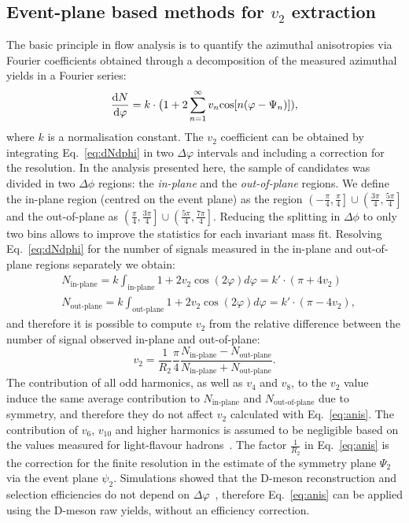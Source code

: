 \subsection{Event-plane based methods for $v_2$ extraction} 
\label{sec:epMethodsDescript}
The basic principle in flow analysis is to quantify the azimuthal 
anisotropies via Fourier coefficients obtained through a 
decomposition of the measured azimuthal yields in a Fourier series:
\begin{equation}
\label{eq:dNdphi}
\frac{{\rm d} N}{{\rm d} \varphi} = k \cdot \big ( 1 + 2 \sum_{n=1}^{\infty} v_n {\rm cos}[n (\varphi - \Psi_n)] ),
\end{equation}
where $k$ is a normalisation constant. 
The $v_2$ coefficient can be obtained by integrating Eq.~\ref{eq:dNdphi}
in two $\Delta \varphi$ intervals and including a correction for the
resolution. In the analysis presented here, the sample of candidates was 
divided in two $\Delta\phi$ regions: the \textit{in-plane} 
and the \textit{out-of-plane} regions. We define the in-plane 
region (centred on the event plane) as the region 
$\left(-\frac{\pi}{4},\frac{\pi}{4}\right]\cup\left(\frac{3\pi}{4},\frac{5\pi}{4}\right]$ and
 the out-of-plane as $\left(\frac{\pi}{4},\frac{3\pi}{4}\right]\cup\left(\frac{5\pi}{4},\frac{7\pi}{4}\right]$. 
 Reducing the splitting in $\Delta\phi$ to only two bins allows 
 to improve the statistics for each invariant mass fit. Resolving 
 Eq.~\ref{eq:dNdphi} for the number of signals measured 
 in the in-plane and out-of-plane regions separately we obtain:
\begin{equation}\label{eq:ninout}
 \begin{split}
  & N_\text{in-plane} = k\int_\text{in-plane}1+2v_2\cos(2\varphi)d\varphi = k'\cdot(\pi+4v_2)\\
  & N_\text{out-plane} = k\int_\text{out-plane}1+2v_2\cos(2\varphi)d\varphi= k'\cdot(\pi-4v_2),
 \end{split}
\end{equation}
and therefore it is possible to compute $v_2$ from the relative 
difference between the number of signal observed in-plane and out-of-plane:
\begin{equation}
\label{eq:anis}
 v_2 = \frac{1}{R_2} \frac{\pi}{4}\frac{N_\text{in-plane}-N_\text{out-plane}}{N_\text{in-plane}+N_\text{out-plane}}.
\end{equation}
The contribution of all odd harmonics, 
as well as $v_4$ and $v_8$, to the $v_2$ value induce the same average 
contribution to $N_\text{in-plane}$ and $N_\text{out-of-plane}$ 
due to symmetry, and therefore they do not affect $v_2$ calculated with 
Eq.~\ref{eq:anis}. The contribution of $v_6$, $v_{10}$ and higher 
harmonics is assumed to be negligible based on the 
values measured for light-flavour hadrons~\cite{Aamodt:2011by,ATLAS:2012at}.
The factor $\frac{1}{R_2}$ in Eq.~\ref{eq:anis} is the correction for the finite resolution in the
estimate of the symmetry plane $\Psi_2$ via the event plane $\psi_2$.
 Simulations showed that the D-meson reconstruction 
 and selection efficiencies do not depend on $\Delta\varphi$~\cite{Abelev:2014ipa}, 
therefore Eq.~\ref{eq:anis} can be applied using the 
D-meson raw yields, without an efficiency correction.

